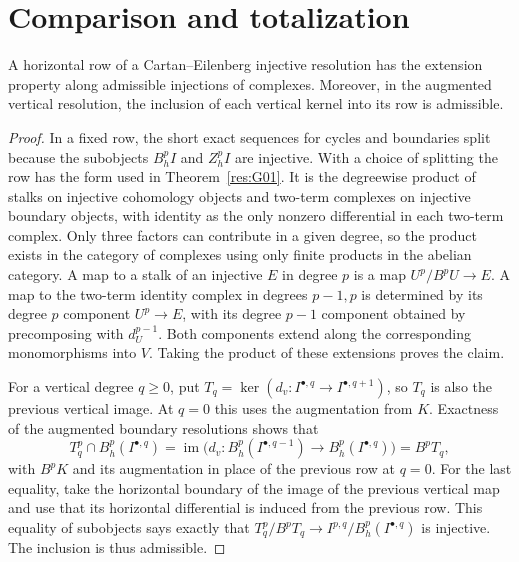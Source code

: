 \section{Comparison and totalization}

\begin{lemma}
\label{res:G08}
A horizontal row of a Cartan--Eilenberg injective resolution has the
extension property along admissible injections of complexes.
Moreover, in the augmented vertical resolution, the inclusion of
each vertical kernel into its row is admissible.
\end{lemma}

\begin{proof}
In a fixed row, the short exact sequences for cycles and boundaries
split because the subobjects \(B_h^p I\) and \(Z_h^p I\) are injective.
With a choice of splitting the row has the form used in
Theorem~\ref{res:G01}. It is the degreewise product of stalks on
injective cohomology objects and two-term complexes on injective
boundary objects, with identity as the only nonzero differential in
each two-term complex. Only three factors can contribute in a given
degree, so the product exists in the category of complexes using
only finite products in the abelian category. A map to a stalk of
an injective \(E\) in degree \(p\) is a map \(U^p/B^pU\to E\). A
map to the two-term identity complex in degrees \(p-1,p\) is
determined by its degree \(p\) component \(U^p\to E\), with its
degree \(p-1\) component obtained by precomposing with \(d_U^{p-1}\).
Both components extend along the corresponding monomorphisms into
\(V\). Taking the product of these extensions proves the claim.

For a vertical degree \(q\ge0\), put
\(T_q=\ker(d_v:I^{\bullet,q}\to I^{\bullet,q+1})\), so \(T_q\)
is also the previous vertical image. At \(q=0\) this uses the
augmentation from \(K\). Exactness of the augmented boundary
resolutions shows that
\[
  T_q^p\cap B_h^p(I^{\bullet,q})
    = \operatorname{im}\bigl(d_v:B_h^p(I^{\bullet,q-1})
                           \to B_h^p(I^{\bullet,q})\bigr)
    = B^p T_q ,
\]
with \(B^pK\) and its augmentation in place of the previous row at
\(q=0\). For the last equality, take the horizontal boundary of
the image of the previous vertical map and use that its
horizontal differential is induced from the previous row.
This equality of subobjects says exactly that
\(T_q^p/B^pT_q\to I^{p,q}/B_h^p(I^{\bullet,q})\) is injective.
The inclusion is thus admissible.
\end{proof}

